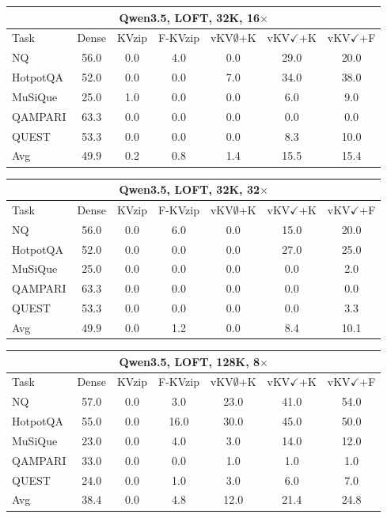 \begin{tabular}{lcccccc}
\toprule
\multicolumn{7}{c}{Qwen3.5, LOFT, 32K, 16$\times$} \\
\midrule
Task & Dense & KVzip & F-KVzip & vKV$\emptyset$+K & vKV$\checkmark$+K & vKV$\checkmark$+F \\
\midrule
NQ & 56.0 & 0.0 & 4.0 & 0.0 & 29.0 & 20.0 \\
HotpotQA & 52.0 & 0.0 & 0.0 & 7.0 & 34.0 & 38.0 \\
MuSiQue & 25.0 & 1.0 & 0.0 & 0.0 & 6.0 & 9.0 \\
QAMPARI & 63.3 & 0.0 & 0.0 & 0.0 & 0.0 & 0.0 \\
QUEST & 53.3 & 0.0 & 0.0 & 0.0 & 8.3 & 10.0 \\
\midrule
Avg & 49.9 & 0.2 & 0.8 & 1.4 & 15.5 & 15.4 \\
\bottomrule
\end{tabular}
\vspace{0.8em}

\begin{tabular}{lcccccc}
\toprule
\multicolumn{7}{c}{Qwen3.5, LOFT, 32K, 32$\times$} \\
\midrule
Task & Dense & KVzip & F-KVzip & vKV$\emptyset$+K & vKV$\checkmark$+K & vKV$\checkmark$+F \\
\midrule
NQ & 56.0 & 0.0 & 6.0 & 0.0 & 15.0 & 20.0 \\
HotpotQA & 52.0 & 0.0 & 0.0 & 0.0 & 27.0 & 25.0 \\
MuSiQue & 25.0 & 0.0 & 0.0 & 0.0 & 0.0 & 2.0 \\
QAMPARI & 63.3 & 0.0 & 0.0 & 0.0 & 0.0 & 0.0 \\
QUEST & 53.3 & 0.0 & 0.0 & 0.0 & 0.0 & 3.3 \\
\midrule
Avg & 49.9 & 0.0 & 1.2 & 0.0 & 8.4 & 10.1 \\
\bottomrule
\end{tabular}
\vspace{0.8em}

\begin{tabular}{lcccccc}
\toprule
\multicolumn{7}{c}{Qwen3.5, LOFT, 128K, 8$\times$} \\
\midrule
Task & Dense & KVzip & F-KVzip & vKV$\emptyset$+K & vKV$\checkmark$+K & vKV$\checkmark$+F \\
\midrule
NQ & 57.0 & 0.0 & 3.0 & 23.0 & 41.0 & 54.0 \\
HotpotQA & 55.0 & 0.0 & 16.0 & 30.0 & 45.0 & 50.0 \\
MuSiQue & 23.0 & 0.0 & 4.0 & 3.0 & 14.0 & 12.0 \\
QAMPARI & 33.0 & 0.0 & 0.0 & 1.0 & 1.0 & 1.0 \\
QUEST & 24.0 & 0.0 & 1.0 & 3.0 & 6.0 & 7.0 \\
\midrule
Avg & 38.4 & 0.0 & 4.8 & 12.0 & 21.4 & 24.8 \\
\bottomrule
\end{tabular}
\vspace{0.8em}

